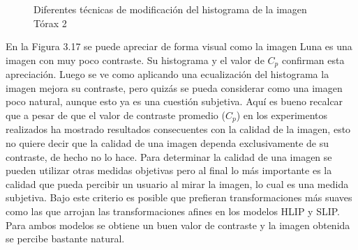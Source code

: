\begin{figure}
\begin{center}
		\caption{Diferentes t\'ecnicas de modificaci\'on del histograma de la imagen T\'orax 2}
	\end{center}
\end{figure}

En la Figura 3.17 se puede apreciar de forma visual como la imagen Luna es una imagen con muy poco contraste. Su histograma y el valor de $C_p$ confirman esta apreciaci\'on. Luego se ve como aplicando una ecualizaci\'on del histograma la imagen mejora su contraste, pero quiz\'as se pueda considerar como una imagen poco natural, aunque esto ya es una cuesti\'on subjetiva. Aqu\'i es bueno recalcar que a pesar de que el valor de contraste promedio ($C_p$) en los experimentos realizados ha mostrado resultados consecuentes con la calidad de la imagen, esto no quiere decir que la calidad de una imagen dependa exclusivamente de su contraste, de hecho no lo hace. Para determinar la calidad de una imagen se pueden utilizar otras medidas objetivas pero al final lo m\'as importante es la calidad que pueda percibir un usuario al mirar la imagen, lo cual es una medida subjetiva. Bajo este criterio es posible que prefieran transformaciones m\'as suaves como las que arrojan las transformaciones afines en los modelos HLIP y SLIP. Para ambos modelos se obtiene un buen valor de contraste y la imagen obtenida se percibe bastante natural.

